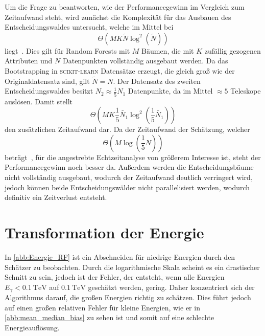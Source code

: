 Um die Frage zu beantworten, wie der Performancegewinn im Vergleich zum Zeitaufwand steht, wird zunächst die Komplexität für das Ausbauen des Entscheidungswaldes untersucht,
welche im Mittel bei
\begin{equation}
  \Theta (MK\tilde{N} \log^2\left(\tilde{N}\right))
\end{equation}
liegt~\cite[96]{understanding_RF}.
Dies gilt für Random Forests mit $M$ Bäumen, die mit $K$ zufällig gezogenen Attributen und $N$ Datenpunkten vollständig ausgebaut werden.
Da das Bootstrapping in \textsc{scikit-learn} Datensätze erzeugt, die gleich groß wie der Originaldatensatz sind, gilt $\tilde{N}= N$.
Der Datensatz des zweiten Entscheidungswaldes besitzt $N_2 \approx \frac{1}{5}N_1$ Datenpunkte, da im Mittel $\approx 5$ Teleskope auslösen.
Damit stellt
\begin{equation}
  \Theta \left(MK\frac{1}{5}\tilde{N_1} \log^2\left(\frac{1}{5}\tilde{N_1}\right)\right)
\end{equation}
den zusätzlichen Zeitaufwand dar.
Da der Zeitaufwand der Schätzung, welcher
\begin{equation}
  \Theta\left(M\log\left(\frac{1}{5}N\right)\right)
\end{equation}
beträgt~\cite[98]{understanding_RF}, für die angestrebte Echtzeitanalyse von größerem Interesse ist, steht der Performancegewinn noch besser da.
Außerdem werden die Entscheidungsbäume nicht vollständig ausgebaut, wodurch der Zeitaufwand deutlich verringert wird, jedoch können beide Entscheidungswälder nicht
parallelisiert werden, wodurch definitiv ein Zeitverlust entsteht.

\section{Transformation der Energie}

In \autoref{abb:Energie_RF} ist ein Abschneiden für niedrige Energien durch den Schätzer zu beobachten.
Durch die logarithmische Skala scheint es ein drastischer Schnitt zu sein, jedoch ist der Fehler, der entsteht, wenn alle Energien $E_\gamma < \SI{0.1}{\tera\eV}$
auf $\SI{0.1}{\tera\eV}$ geschätzt werden, gering.
Daher konzentriert sich der Algorithmus darauf, die großen Energien richtig zu schätzen.
Dies führt jedoch auf einen großen relativen Fehler für kleine Energien, wie er in \autoref{abb:mean_median_bias} zu sehen ist und somit auf eine schlechte
Energieauflösung.

